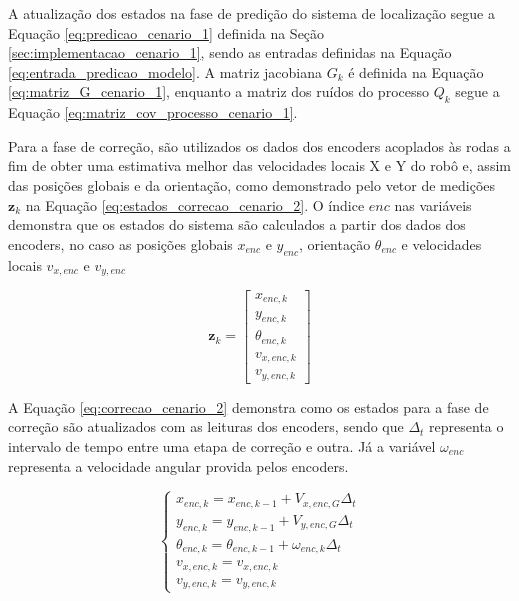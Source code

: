 \documentclass[acronym, symbols, table]{fei}
\begin{document}
			A atualização dos estados na fase de predição do sistema de localização segue a Equação \eqref{eq:predicao_cenario_1} definida na Seção \ref{sec:implementacao_cenario_1}, sendo as entradas definidas na Equação \eqref{eq:entrada_predicao_modelo}. A matriz jacobiana $G_k$ é definida na Equação \eqref{eq:matriz_G_cenario_1}, enquanto a matriz dos ruídos do processo $Q_k$ segue a Equação \eqref{eq:matriz_cov_processo_cenario_1}.
			
			Para a fase de correção, são utilizados os dados dos encoders acoplados às rodas a fim de obter uma estimativa melhor das velocidades locais X e Y do robô e, assim das posições globais e da orientação, como demonstrado pelo vetor de medições $\textbf{z}_k$ na Equação \eqref{eq:estados_correcao_cenario_2}. O índice $enc$ nas variáveis demonstra que os estados do sistema são calculados a partir dos dados dos encoders, no caso as posições globais $x_{enc}$ e $y_{enc}$, orientação $\theta_{enc}$ e velocidades locais $v_{x,enc}$ e $v_{y,enc}$
			
	 		\begin{equation}\label{eq:estados_correcao_cenario_2}
				\textbf{z}_k  = 
				\begin{bmatrix}
					x_{enc,k} \\
					y_{enc,k} \\
					\theta_{enc,k} \\
					v_{x,enc,k} \\
					v_{y,enc,k}
				\end{bmatrix}
			\end{equation}
		
			A Equação \eqref{eq:correcao_cenario_2} demonstra como os estados para a fase de correção são atualizados com as leituras dos encoders, sendo que $\Delta_t$ representa o intervalo de tempo entre uma etapa de correção e outra. Já a variável $\omega_{enc}$ representa a velocidade angular provida pelos encoders.
			
			\begin{equation}\label{eq:correcao_cenario_2}
				\begin{cases}
					x_{enc,k} = x_{enc,k-1} + V_{x,enc,G} \Delta_t \\
					y_{enc,k} = y_{enc,k-1} + V_{y,enc,G} \Delta_t  \\
					\theta_{enc,k} = \theta_{enc,k-1} + \omega_{enc,k} \Delta_t \\
					v_{x,enc,k} = v_{x,enc,k}\\
					v_{y,enc,k} = v_{y,enc,k}
				\end{cases}
			\end{equation}
			
\end{document}
